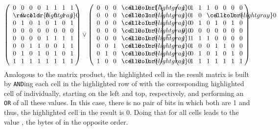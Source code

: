\[
\left(%
\begin{array}{*{8}{>{\centering\arraybackslash$}p{1mm}<{$}}}
	0 & 0 & 0 & 0 & 1 & 1 & 1 & 1 \\
	\rowcolor{lightgray}0 & 0 & 1 & 1 & 0 & 0 & 1 & 1 \\
	0 & 1 & 0 & 1 & 0 & 1 & 0 & 1 \\
	0 & 0 & 0 & 0 & 0 & 0 & 0 & 0 \\
	0 & 0 & 0 & 0 & 1 & 1 & 1 & 1 \\
	0 & 0 & 1 & 1 & 0 & 0 & 1 & 1 \\
	0 & 1 & 0 & 1 & 0 & 1 & 0 & 1 \\
	1 & 1 & 1 & 1 & 1 & 1 & 1 & 1
\end{array}
\right)
\lor
\left(%
\begin{array}{*{8}{>{\centering\arraybackslash$}p{1mm}<{$}}}
	0 & 0 & 0 & \cellcolor{lightgray}0 & 0 & 0 & 0 & 1 \\
	0 & 0 & 0 & \cellcolor{lightgray}0 & 0 & 0 & 1 & 0 \\
	0 & 0 & 0 & \cellcolor{lightgray}0 & 0 & 1 & 0 & 0 \\
	0 & 0 & 0 & \cellcolor{lightgray}0 & 1 & 0 & 0 & 0 \\
	0 & 0 & 0 & \cellcolor{lightgray}1 & 0 & 0 & 0 & 0 \\
	0 & 0 & 1 & \cellcolor{lightgray}0 & 0 & 0 & 0 & 0 \\
	0 & 1 & 0 & \cellcolor{lightgray}0 & 0 & 0 & 0 & 0 \\
	1 & 0 & 0 & \cellcolor{lightgray}0 & 0 & 0 & 0 & 0
\end{array}
\right)
=
\left(%
\begin{array}{*{8}{>{\centering\arraybackslash$}p{1mm}<{$}}}
	1 & 1 & 1 & 1 & 0 & 0 & 0 & 0 \\
	1 & 1 & 0 & \cellcolor{lightgray}0 & 1 & 1 & 0 & 0 \\
	1 & 0 & 1 & 0 & 1 & 0 & 1 & 0 \\
	0 & 0 & 0 & 0 & 0 & 0 & 0 & 0 \\
	1 & 1 & 1 & 1 & 0 & 0 & 0 & 0 \\
	1 & 1 & 0 & 0 & 1 & 1 & 0 & 0 \\
	1 & 0 & 1 & 0 & 1 & 0 & 1 & 0 \\
	1 & 1 & 1 & 1 & 1 & 1 & 1 & 1
\end{array}
\right)
\]
Analogous to the matrix product, the highlighted cell in the result matrix is built by {\tt AND}ing each cell in the highlighted row of  with the corresponding highlighted cell of  individually, starting on the left and top, respectively, and performing an {\tt OR} of all these values. In this case, there is no pair of bits in which both are 1 and thus, the highlighted cell in the result is 0. Doing that for all cells leads to the value , \ie the bytes of  in the opposite order. \citep[pg. 192]{mmix-buch}

